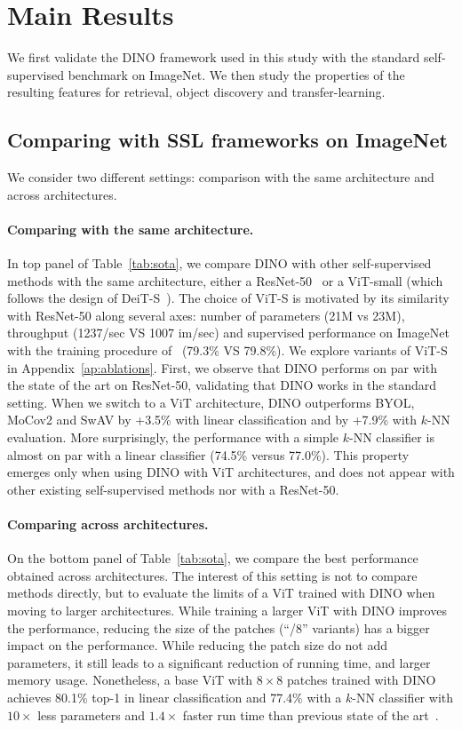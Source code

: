 \section{Main Results} We first validate the DINO framework used in this study with the standard self-supervised benchmark on ImageNet. We then study the properties of the resulting features for retrieval, object discovery and transfer-learning.

\subsection{Comparing with SSL frameworks on ImageNet} We consider two different settings: comparison with the same architecture and across architectures.

\paragraph{Comparing with the same architecture.} In top panel of Table~\ref{tab:sota}, we compare DINO with other self-supervised methods with the same architecture, either a ResNet-50~\cite{he2016deep} or a ViT-small (which follows the design of DeiT-S~\cite{touvron2020training}). The choice of ViT-S is motivated by its similarity with ResNet-50 along several axes: number of parameters (21M vs 23M), throughput (1237/sec VS 1007 im/sec) and supervised performance on ImageNet with the training procedure of~\cite{touvron2020training} (79.3\% VS 79.8\%).
We explore variants of ViT-S in Appendix~\ref{ap:ablations}.
First, we observe that DINO performs on par with the state of the art on ResNet-50, validating that DINO works in the standard setting. When we switch to a ViT architecture, DINO outperforms BYOL, MoCov2 and SwAV by +3.5\% with linear classification and by +7.9\% with $k$-NN evaluation. More surprisingly, the performance with a simple $k$-NN classifier is almost on par with a linear classifier (74.5\% versus 77.0\%).
This property emerges only when using DINO with ViT architectures, and does not appear with other existing self-supervised methods nor with a ResNet-50.

\paragraph{Comparing across architectures.} On the bottom panel of Table~\ref{tab:sota}, we compare the best performance obtained across architectures. The interest of this setting is not to compare methods directly, but to evaluate the limits of a ViT trained with DINO when moving to larger architectures. While training a larger ViT with DINO improves the performance, reducing the size of the patches (``/8'' variants) has a bigger impact on the performance. While reducing the patch size do not add parameters, it still leads to a significant reduction of running time, and larger memory usage. Nonetheless, a base ViT with $8\times 8$ patches trained with DINO achieves 80.1\% top-1 in linear classification and 77.4\% with a $k$-NN classifier with $10\times$ less parameters and $1.4\times$ faster run time than previous state of the art~\cite{chen2020big}.

